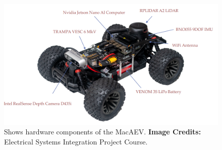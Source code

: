 \documentclass[conference]{IEEEtran}
\begin{document}

\begin{figure}
    \centering
    \includegraphics[scale=0.3]{vehicle.png}
    \caption{Shows hardware components of the MacAEV. \textbf{Image Credits:} Electrical Systems Integration Project Course.}
    \label{Figure 1}
\end{figure}



\end{document}
